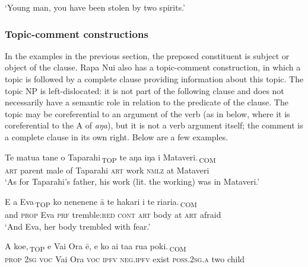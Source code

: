 \glt 
‘Young man, you have been stolen by two spirits.’ \textstyleExampleref{[R310.057]} 
\z
{}

\subsubsection[Topic{}-comment constructions]{Topic-comment constructions}\label{sec:8.6.1.3}
In the examples in the previous section, the preposed constituent is subject or object of the clause. Rapa Nui also has a topic-comment construction, in which a topic  is followed by a complete clause providing information about this topic. The topic NP is left-dislocated: it is not part of the following clause and does not necessarily have a semantic role in relation to the predicate of the clause. The topic may be coreferential to an argument of the verb (as in  below, where it is coreferential to the A of \textit{aŋa}), but it is not a verb argument itself; the comment is a complete clause in its own right. Below are a few examples. 

\ea\label{ex:8.78}
\gll {\ob}Te matu{\ꞌ}a tane o Taparahi\,{\cb}\textsubscript{\textup{TOP}} {\ob}te aŋa iŋa {\ꞌ}i Mataveri.\,{\cb}\textsubscript{\textup{COM}} \\
{\db}\textsc{art} parent male of Taparahi {\db}\textsc{art} work \textsc{nmlz} at Mataveri \\

\glt 
‘As for Taparahi’s father, his work (lit. the working) was in Mataveri.’ \textstyleExampleref{[R250.043]} 
\z

\ea\label{ex:8.79}
\gll {\ꞌ}E {\ob}a Eva\,{\cb}\textsubscript{\textup{TOP}} {\ob}ko nenenene {\ꞌ}ā te hakari {\ꞌ}i te ri{\ꞌ}ari{\ꞌ}a.\,{\cb}\textsubscript{\textup{COM}} \\
and {\db}\textsc{prop} Eva {\db}\textsc{prf} tremble:\textsc{red} \textsc{cont} \textsc{art} body at \textsc{art} afraid \\

\glt 
‘And Eva, her body trembled with fear.’ \textstyleExampleref{[R210.031]} 
\z

\ea\label{ex:8.80}
\gll {\ob}A koe,\,{\cb}\textsubscript{\textup{TOP}} e Vai Ora ē, {\ob}e ko ai ta{\ꞌ}a rua poki.\,{\cb}\textsubscript{\textup{COM}} \\
{\db}\textsc{prop} \textsc{2sg} \textsc{voc} Vai Ora \textsc{voc} {\db}\textsc{ipfv} \textsc{neg.ipfv} exist \textsc{poss.2sg.a} two child \\

